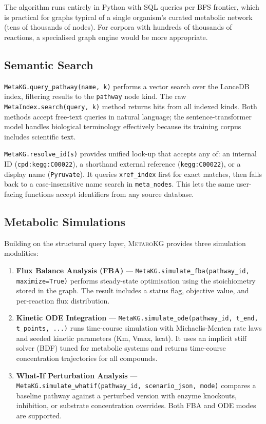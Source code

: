 \documentclass[10pt]{article}
\begin{document}
The algorithm runs entirely in Python with SQL queries per BFS frontier,
which is practical for graphs typical of a single organism's curated metabolic
network (tens of thousands of nodes). For corpora with hundreds of thousands
of reactions, a specialised graph engine would be more appropriate.

\subsection{Semantic Search}

\texttt{MetaKG.query\_pathway(name, k)} performs a vector search over the
LanceDB index, filtering results to the \texttt{pathway} node kind. The raw
\texttt{MetaIndex.search(query, k)} method returns hits from all indexed
kinds. Both methods accept free-text queries in natural language; the
sentence-transformer model handles biological terminology effectively because
its training corpus includes scientific text.

\texttt{MetaKG.resolve\_id(s)} provides unified look-up that accepts any of:
an internal ID (\texttt{cpd:kegg:C00022}), a shorthand external reference
(\texttt{kegg:C00022}), or a display name (\texttt{Pyruvate}). It queries
\texttt{xref\_index} first for exact matches, then falls back to a
case-insensitive name search in \texttt{meta\_nodes}. This lets the same
user-facing functions accept identifiers from any source database.

\subsection{Metabolic Simulations}

Building on the structural query layer, \textsc{MetaboKG} provides three
simulation modalities:

\begin{enumerate}[leftmargin=*,itemsep=2pt]
  \item \textbf{Flux Balance Analysis (FBA)} ---
    \texttt{MetaKG.simulate\_fba(pathway\_id, maximize=True)} performs
    steady-state optimisation using the stoichiometry stored in the graph.
    The result includes a status flag, objective value, and per-reaction flux
    distribution.

  \item \textbf{Kinetic ODE Integration} ---
    \texttt{MetaKG.simulate\_ode(pathway\_id, t\_end, t\_points, ...)}
    runs time-course simulation with Michaelis-Menten rate laws and seeded
    kinetic parameters (Km, Vmax, kcat). It uses an implicit stiff solver
    (BDF) tuned for metabolic systems and returns time-course concentration
    trajectories for all compounds.

  \item \textbf{What-If Perturbation Analysis} ---
    \texttt{MetaKG.simulate\_whatif(pathway\_id, scenario\_json, mode)}
    compares a baseline pathway against a perturbed version with enzyme
    knockouts, inhibition, or substrate concentration overrides. Both FBA
    and ODE modes are supported.
\end{enumerate}
\end{document}
